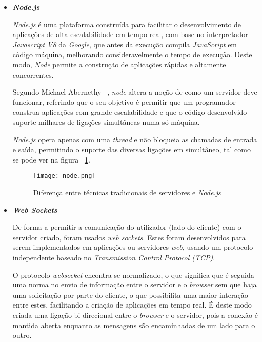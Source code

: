 \begin{itemize}

\item \textbf{\textit{Node.js}}


\textit{Node.js} é uma plataforma construída para facilitar o desenvolvimento de aplicações de alta escalabilidade em tempo real, com base no interpretador \textit{Javascript V8} da \textit{Google}, que antes da execução compila \textit{JavaScript} em código máquina, melhorando consideravelmente o tempo de execução. Deste modo, \textit{Node} permite a construção de aplicações rápidas e altamente concorrentes.

Segundo Michael Abernethy ~\cite{Abernethy2011}, \textit{node} altera a noção de como um servidor deve funcionar, referindo que o seu objetivo é permitir que um programador construa aplicações com grande escalabilidade e que o código desenvolvido suporte milhares de ligações simultâneas numa só máquina. 

\textit{Node.js} opera apenas com uma \textit{thread} e não bloqueia as chamadas de entrada e saída, permitindo o suporte das diversas ligações em simultâneo, tal como se pode ver na figura ~\ref{fig:node}.

\begin{figure}[ht]
\centering
\texttt{[image: node.png]}
\caption[\textit{Node.js}] {Diferença entre técnicas tradicionais de servidores e \textit{Node.js}\protect\footnotemark}
\label{fig:node}
\end{figure}


\pagebreak

\item \textbf{\textit{Web Sockets}}

De forma a permitir a comunicação do utilizador (lado do cliente) com o servidor criado, foram usados \textit{web sockets}. Estes foram desenvolvidos para serem implementados em aplicações ou servidores \textit{web}, usando um protocolo independente baseado no \textit{Transmission Control Protocol (TCP)}.

O protocolo \textit{websocket} encontra-se normalizado, o que significa que é seguida uma norma no envio de informação entre o servidor e o \textit{browser} sem que haja uma solicitação por parte do cliente, o que possibilita uma maior interação entre estes, facilitando a criação de aplicações em tempo real. É deste modo criada uma ligação bi-direcional entre o \textit{browser} e o servidor, pois a conexão é mantida aberta enquanto as mensagens são encaminhadas de um lado para o outro.



\end{itemize}
